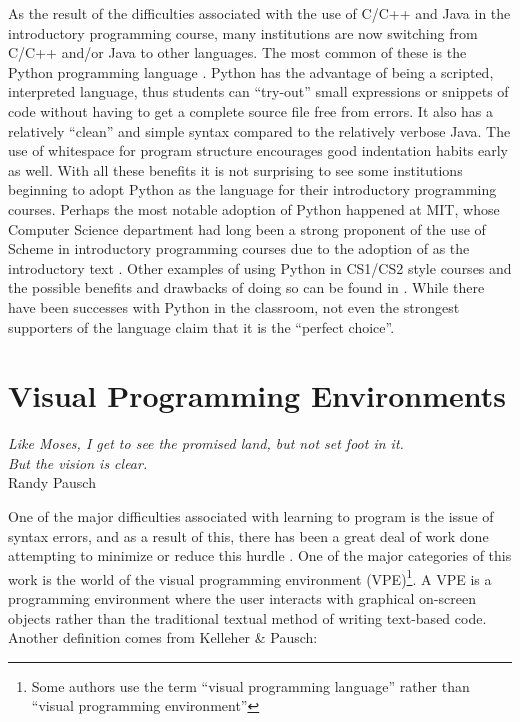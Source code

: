 As the result of the difficulties associated with the use of C/C++ and Java in the introductory programming course, many institutions are now switching from C/C++ and/or Java to other languages.  The most common of these is the Python programming language \cite{python}.  Python has the advantage of being a scripted, interpreted language, thus students can ``try-out'' small expressions or snippets of code without having to get a complete source file free from errors.  It also has a relatively ``clean'' and simple syntax compared to the relatively verbose Java.  The use of whitespace for program structure encourages good indentation habits early as well.  With all these benefits it is not surprising to see some institutions beginning to adopt Python as the language for their introductory programming courses.  Perhaps the most notable adoption of Python happened at MIT, whose Computer Science department had long been a strong proponent of the use of Scheme in introductory programming courses due to the adoption of \cite{SICPbook} as the introductory text \cite{Thetech06}.  Other examples of using Python in CS1/CS2 style courses and the possible benefits and drawbacks of doing so can be found in \cite{Radenski06,Shannon03,Agarwal05,Agarwal08}.  While there have been successes with Python in the classroom, not even the strongest supporters of the language claim that it is the ``perfect choice''.

\section{Visual Programming Environments}
\label{sec:vpes}

\begin{flushright}
\textit{Like Moses, I get to see the promised land, but not set foot in it.  \\
But the vision is clear.}
\\
Randy Pausch \cite{Pausch08} \\
\end{flushright}

One of the major difficulties associated with learning to program is the issue of syntax errors, and as a result of this, there has been a great deal of work done attempting to minimize or reduce this hurdle \cite{Kelleher05}.  One of the major categories of this work is the world of the visual programming environment (VPE)\footnote{Some authors use the term ``visual programming language'' rather than ``visual programming environment''}.  A VPE is a programming environment where the user interacts with graphical on-screen objects rather than the traditional textual method of writing text-based code.  Another definition comes from Kelleher \& Pausch:

